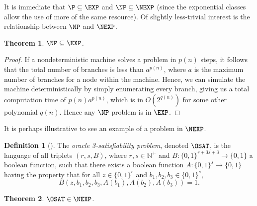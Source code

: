 \documentclass[english,12pt]{reedthesis}
\theoremstyle{plain}
\newtheorem{thm}{Theorem}[section]
\theoremstyle{definition}
\newtheorem{defn}[defn]{Definition}
\theoremstyle{remark}
\begin{document}
It is immediate that $\P \subseteq \EXP$ and $\NP \subseteq \NEXP$ (since the exponential
classes allow the use of more of the same resource). Of slightly less-trivial
interest is the relationship between $\NP$ and $\NEXP$.

\begin{thm}\label{thm:np-exp}
  $\NP \subseteq \EXP$.
\end{thm}

\begin{proof}
  If a nondeterministic machine solves a problem in $p(n)$ steps, it follows
  that the total number of branches is less than $a^{p(n)}$, where $a$ is the
  maximum number of branches for a node within the machine. Hence, we can
  simulate the machine deterministically by simply enumerating every branch,
  giving us a total computation time of $p(n)a^{p(n)}$, which is in
  $O(2^{q(n)})$ for some other polynomial $q(n)$. Hence any $\NP$ problem is in
  $\EXP$.
\end{proof}

It is perhaps illustrative to see an example of a problem in $\NEXP$. %

\begin{defn}[{\cite[Def.\ 14.1]{CFGS22}}]\label{def:oracle-3sat}
  The \emph{oracle 3-satisfiability problem}, denoted $\OSAT$, is the language
  of all triplets $(r, s, B)$, where $r, s \in \mathbb{N}^{+}$ and
  $B: \{0, 1\}^{r+3s+3} \rightarrow \{0, 1\}$ a boolean function, such that there exists a
  boolean function $A: \{0, 1\}^{s} \rightarrow \{0, 1\}$ having the property that for all
  $z \in \{0, 1\}^{r}$ and $b_{1}, b_{2}, b_{3} \in \{0, 1\}^{s}$,
  \begin{equation*}
    B(z, b_{1}, b_{2}, b_{3}, A(b_{1}), A(b_{2}), A(b_{3})) = 1.
  \end{equation*}
\end{defn}

\begin{thm}\label{thm:o3sat-in-nexp}
  $\OSAT \in \NEXP$.
\end{thm}
\end{document}

